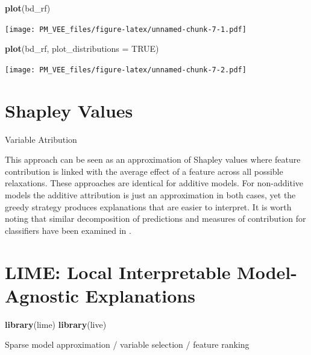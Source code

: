 \documentclass[]{book}
\newenvironment{Shaded}{\begin{snugshade}}{\end{snugshade}}
\newcommand{\DataTypeTok}[1]{\textcolor[rgb]{0.13,0.29,0.53}{#1}}
\newcommand{\KeywordTok}[1]{\textcolor[rgb]{0.13,0.29,0.53}{\textbf{#1}}}
\newcommand{\NormalTok}[1]{#1}
\newcommand{\OtherTok}[1]{\textcolor[rgb]{0.56,0.35,0.01}{#1}}
\theoremstyle{definition}
\theoremstyle{definition}
\theoremstyle{definition}
\theoremstyle{remark}
\begin{document}
\begin{Shaded}
\begin{Highlighting}[]
\KeywordTok{plot}\NormalTok{(bd_rf) }
\end{Highlighting}
\end{Shaded}

\texttt{[image: PM\_VEE\_files/figure-latex/unnamed-chunk-7-1.pdf]}

\begin{Shaded}
\begin{Highlighting}[]
\KeywordTok{plot}\NormalTok{(bd_rf, }\DataTypeTok{plot_distributions =} \OtherTok{TRUE}\NormalTok{) }
\end{Highlighting}
\end{Shaded}

\texttt{[image: PM\_VEE\_files/figure-latex/unnamed-chunk-7-2.pdf]}

\hypertarget{shapley}{%
\chapter{Shapley Values}\label{shapley}}

Variable Atribution

This approach can be seen as an approximation of Shapley values where
feature contribution is linked with the average effect of a feature
across all possible relaxations. These approaches are identical for
additive models. For non-additive models the additive attribution is
just an approximation in both cases, yet the greedy strategy produces
explanations that are easier to interpret. It is worth noting that
similar decomposition of predictions and measures of contribution for
classifiers have been examined in \cite{4407709}.

\hypertarget{LIME}{%
\chapter{LIME: Local Interpretable Model-Agnostic
Explanations}\label{LIME}}

\citep{R-lime} \citep{R-live}

\begin{Shaded}
\begin{Highlighting}[]
\KeywordTok{library}\NormalTok{(lime)}
\KeywordTok{library}\NormalTok{(live)}
\end{Highlighting}
\end{Shaded}

Sparse model approximation / variable selection / feature ranking
\end{document}
